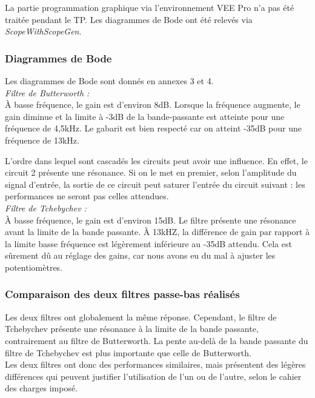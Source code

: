 \documentclass[../../Cours_M1.tex]{subfiles}
\begin{document}
La partie programmation graphique via l'environnement VEE Pro n'a pas été traitée pendant le TP. Les diagrammes de Bode ont été relevés via \textit{ScopeWithScopeGen}.

\subsubsection{Diagrammes de Bode}
Les diagrammes de Bode sont donnés en annexes 3 et 4.\\

\textit{Filtre de Butterworth :}\\
À basse fréquence, le gain est d'environ 8dB. Lorsque la fréquence augmente, le gain diminue et la limite à -3dB de la bande-passante est atteinte pour une fréquence de 4,5kHz. Le gabarit est bien respecté car on atteint -35dB pour une fréquence de 13kHz.

L'ordre dans lequel sont cascadés les circuits peut avoir une influence. En effet, le circuit 2 présente une résonance. Si on le met en premier, selon l'amplitude du signal d'entrée, la sortie de ce circuit peut saturer l'entrée du circuit suivant : les performances ne seront pas celles attendues. \\

\textit{Filtre de Tchebychev :}\\
À basse fréquence, le gain est d'environ 15dB. Le filtre présente une résonance avant la limite de la bande passante. À 13kHZ, la différence de gain par rapport à la limite basse fréquence est légèrement inférieure au -35dB attendu. Cela est sûrement dû au réglage des gains, car nous avons eu du mal à ajuster les potentiomètres.

\subsubsection{Comparaison des deux filtres passe-bas réalisés}
Les deux filtres ont globalement la même réponse. Cependant, le filtre de Tchebychev présente une résonance à la limite de la bande passante, contrairement au filtre de Butterworth. La pente au-delà de la bande passante du filtre de Tchebychev est plus importante que celle de Butterworth.\\

Les deux filtres ont donc des performances similaires, mais présentent des légères différences qui peuvent justifier l'utilisation de l'un ou de l'autre, selon le cahier des charges imposé.
\end{document}

